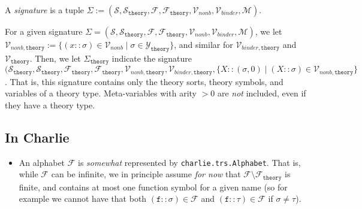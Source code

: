 \documentclass{lmcs}
\theoremstyle{theorem}\newtheorem{theorem}{Theorem}
\theoremstyle{theorem}\newtheorem{lemma}[theorem]{Lemma}
\theoremstyle{theorem}\newtheorem{corollary}[theorem]{Corollary}
\theoremstyle{definition}\newtheorem{definition}[theorem]{Definition}
\theoremstyle{definition}\newtheorem{example}[theorem]{Example}
\newcommand{\F}{\mathcal{F}}
\newcommand{\thF}{\mathcal{F}_{\mathtt{theory}}}
\newcommand{\thSigma}{\Sigma_{\mathtt{theory}}}
\newcommand{\thV}{\mathcal{V}_{\mathtt{theory}}}
\newcommand{\M}{\mathcal{M}}
\newcommand{\Vfree}{\mathcal{V}_{\mathit{nonb}}}
\newcommand{\thVfree}{\mathcal{V}_{\mathit{nonb},\mathtt{theory}}}
\newcommand{\Vbound}{\mathcal{V}_{\mathit{binder}}}
\newcommand{\thVbound}{\mathcal{V}_{\mathit{binder},\mathtt{theory}}}
\newcommand{\Sorts}{\mathcal{S}}
\newcommand{\thSorts}{\mathcal{S}_{\mathtt{theory}}}
\newcommand{\thTypes}{\mathcal{Y}_{\mathtt{theory}}}
\newcommand{\atype}{\sigma}
\newcommand{\btype}{\tau}
\newcommand{\identifier}[1]{\mathtt{#1}}
\newcommand{\afun}{\identifier{f}}
\newcommand{\avar}{x}
\newcommand{\Avar}{X}
\newcommand{\charlie}{\textsf{Charlie}\xspace}
\begin{document}
A \emph{signature} is a tuple $\Sigma := (\Sorts,\thSorts,\F,\thF,\Vfree,
\Vbound,\M)$.

For a given signature $\Sigma = (\Sorts,\thSorts,\F,\thF,\Vfree,\Vbound,\M)$,
we let $\thVfree := \{ (\avar :: \atype) \in \Vfree \mid \atype \in \thTypes\}$,
and similar for $\thVbound$ and $\thV$.  Then, we let $\thSigma$ indicate the
signature $(\thSorts,\thSorts,\thF,\thF,\thVfree,\thVbound,
\{ \Avar :: (\atype,0) \mid (\Avar :: \atype) \in \thVfree \}$.  That is, this
signature contains only the theory sorts, theory symbols, and variables of a
theory type. Meta-variables with arity $> 0$ are \emph{not} included, even if
they have a theory type.

\subsection{In \charlie}

\begin{itemize}
\item An alphabet $\F$ is \emph{somewhat} represented by
  \texttt{charlie.trs.Alphabet}.  That is, while $\F$ can be infinite, we in
  principle assume \emph{for now} that $\F \setminus \thF$ is finite, and
  contains at most one function symbol for a given name (so for example we
  cannot have that both $(\afun :: \atype) \in \F$ and $(\afun :: \btype) \in
  \F$ if $\atype \neq \btype$).
\end{itemize}
\end{document}
